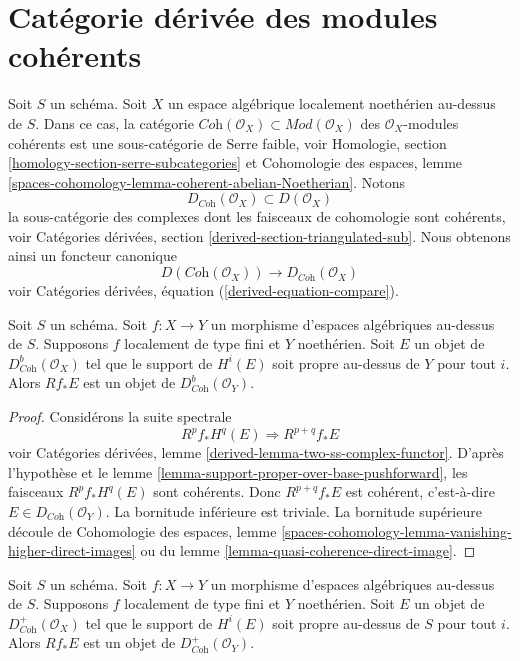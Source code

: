 \section{Catégorie dérivée des modules cohérents}
\label{section-derived-coherent}

\noindent
Soit $S$ un schéma. Soit $X$ un espace algébrique localement noethérien au-dessus de $S$.
Dans ce cas, la catégorie
$\textit{Coh}(\mathcal{O}_X) \subset \textit{Mod}(\mathcal{O}_X)$
des $\mathcal{O}_X$-modules cohérents est une sous-catégorie de Serre faible, voir
Homologie, section \ref{homology-section-serre-subcategories}
et
Cohomologie des espaces, lemme
\ref{spaces-cohomology-lemma-coherent-abelian-Noetherian}.
Notons
$$
D_{\textit{Coh}}(\mathcal{O}_X) \subset D(\mathcal{O}_X)
$$
la sous-catégorie des complexes dont les faisceaux de cohomologie sont cohérents, voir
Catégories dérivées, section \ref{derived-section-triangulated-sub}.
Nous obtenons ainsi un foncteur canonique
\begin{equation}
\label{equation-compare-coherent}
D(\textit{Coh}(\mathcal{O}_X))
\longrightarrow
D_{\textit{Coh}}(\mathcal{O}_X)
\end{equation}
voir Catégories dérivées, équation (\ref{derived-equation-compare}).

\begin{lemma}
\label{lemma-direct-image-coherent}
Soit $S$ un schéma. Soit $f : X \to Y$ un morphisme d'espaces algébriques
au-dessus de $S$. Supposons $f$ localement de type fini et $Y$ noethérien.
Soit $E$ un objet de $D^b_{\textit{Coh}}(\mathcal{O}_X)$ tel que le
support de $H^i(E)$ soit propre au-dessus de $Y$ pour tout $i$.
Alors $Rf_*E$ est un objet de $D^b_{\textit{Coh}}(\mathcal{O}_Y)$.
\end{lemma}

\begin{proof}
Considérons la suite spectrale
$$
R^pf_*H^q(E) \Rightarrow R^{p + q}f_*E
$$
voir Catégories dérivées, lemme \ref{derived-lemma-two-ss-complex-functor}.
D'après l'hypothèse et le lemme \ref{lemma-support-proper-over-base-pushforward},
les faisceaux $R^pf_*H^q(E)$ sont cohérents. Donc
$R^{p + q}f_*E$ est cohérent, c'est-à-dire $E \in D_{\textit{Coh}}(\mathcal{O}_Y)$.
La bornitude inférieure est triviale. La bornitude supérieure
découle de
Cohomologie des espaces, lemme
\ref{spaces-cohomology-lemma-vanishing-higher-direct-images}
ou du
lemme \ref{lemma-quasi-coherence-direct-image}.
\end{proof}

\begin{lemma}
\label{lemma-direct-image-coherent-bdd-below}
Soit $S$ un schéma. Soit $f : X \to Y$ un morphisme d'espaces algébriques
au-dessus de $S$. Supposons $f$ localement de type fini et $Y$ noethérien.
Soit $E$ un objet de $D^+_{\textit{Coh}}(\mathcal{O}_X)$ tel que le support de $H^i(E)$
soit propre au-dessus de $S$ pour tout $i$.
Alors $Rf_*E$ est un objet de $D^+_{\textit{Coh}}(\mathcal{O}_Y)$.
\end{lemma}

